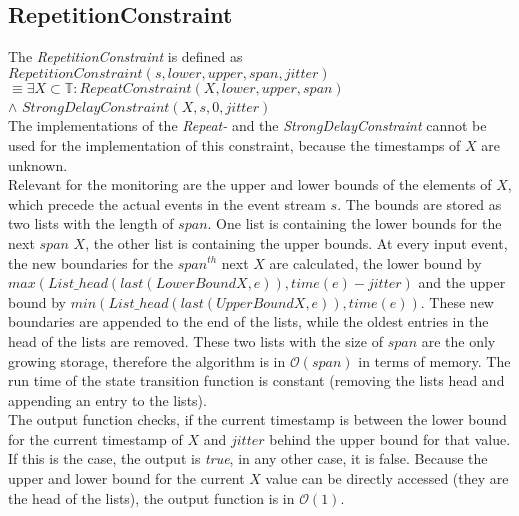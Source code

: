 \subsection{RepetitionConstraint}
	The  \emph{RepetitionConstraint} is defined as\\[10pt]
		$RepetitionConstraint(s, lower, upper, span, jitter)$\\
		$\equiv \exists X\subset \mathbb{T}: RepeatConstraint (X, lower, upper, span)$\\
		\hspace{7cm}$\land$ $StrongDelayConstraint(X, s, 0, jitter)$\\[10pt]
	The implementations of the \emph{Repeat-} and the \emph{StrongDelayConstraint} cannot be used for the implementation of this constraint, because the timestamps of $X$ are unknown.\\
	Relevant for the monitoring are the upper and lower bounds of the elements of $X$, which precede the actual events in the event stream $s$. The bounds are stored as two lists with the length of $span$. One list is containing the lower bounds for the next $span$ $X$, the other list is containing the upper bounds. At every input event, the new boundaries for the $span^{th}$ next $X$ are calculated, the lower bound by $max(List\_head(last(LowerBoundX, e)), time(e)-jitter)$ and the upper bound by $min(List\_head(last(UpperBoundX, e)), time(e))$. These new boundaries are appended to the end of the lists, while the oldest entries in the head of the lists are removed. These two lists with the size of $span$ are the only growing storage, therefore the algorithm is in $\mathcal{O}(span)$ in terms of memory. The run time of the state transition function is constant (removing the lists head and appending an entry to the lists).\\
	The output function checks, if the current timestamp is between the lower bound for the current timestamp of $X$ and $jitter$ behind the upper bound for that value. If this is the case, the output is \emph{true}, in any other case, it is false. Because the upper and lower bound for the current $X$ value can be directly accessed (they are the head of the lists), the output function is in $\mathcal{O}(1)$.
	
